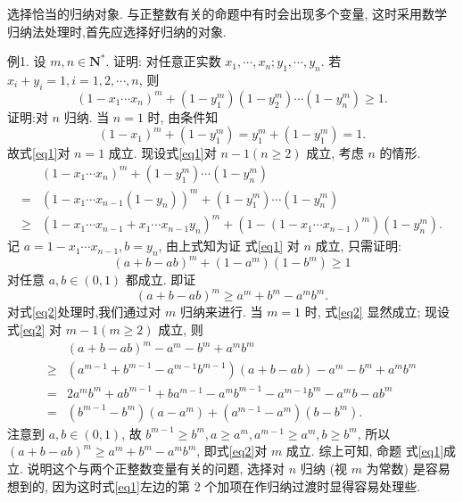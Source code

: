 
选择恰当的归纳对象.
与正整数有关的命题中有时会出现多个变量, 这时采用数学归纳法处理时,首先应选择好归纳的对象.



例1. 设 $m, n \in \mathbf{N}^*$. 证明: 对任意正实数 $x_1, \cdots, x_n ; y_1, \cdots, y_n$. 若 $x_i+ y_i=1, i=1,2, \cdots, n$, 则
$$
\left(1-x_1 \cdots x_n\right)^m+\left(1-y_1^m\right)\left(1-y_2^m\right) \cdots\left(1-y_n^m\right) \geqslant 1 . \label{eq1}
$$
证明:对 $n$ 归纳.
当 $n=1$ 时, 由条件知
$$
\left(1-x_1\right)^m+\left(1-y_1^m\right)=y_1^m+\left(1-y_1^m\right)=1 .
$$
故式\ref{eq1}对 $n=1$ 成立.
现设式\ref{eq1}对 $n-1(n \geqslant 2)$ 成立, 考虑 $n$ 的情形.
$$
\begin{aligned}
& \left(1-x_1 \cdots x_n\right)^m+\left(1-y_1^m\right) \cdots\left(1-y_n^m\right) \\
= & \left(1-x_1 \cdots x_{n-1}\left(1-y_n\right)\right)^m+\left(1-y_1^m\right) \cdots\left(1-y_n^m\right) \\
\geqslant & \left(1-x_1 \cdots x_{n-1}+x_1 \cdots x_{n-1} y_n\right)^m+\left(1-\left(1-x_1 \cdots x_{n-1}\right)^m\right)\left(1-y_n^m\right) .
\end{aligned}
$$
记 $a=1-x_1 \cdots x_{n-1}, b=y_n$, 由上式知为证 式\ref{eq1} 对 $n$ 成立, 只需证明:
$$
(a+b-a b)^m+\left(1-a^m\right)\left(1-b^m\right) \geqslant 1
$$
对任意 $a, b \in(0,1)$ 都成立.
即证
$$
(a+b-a b)^m \geqslant a^m+b^m-a^m b^m . \label{eq2}
$$
对式\ref{eq2}处理时,我们通过对 $m$ 归纳来进行.
当 $m=1$ 时, 式\ref{eq2} 显然成立; 现设 式\ref{eq2} 对 $m-1(m \geqslant 2)$ 成立, 则
$$
\begin{aligned}
& (a+b-a b)^m-a^m-b^m+a^m b^m \\
\geqslant & \left(a^{m-1}+b^{m-1}-a^{m-1} b^{m-1}\right)(a+b-a b)-a^m-b^m+a^m b^m \\
= & 2 a^m b^m+a b^{m-1}+b a^{m-1}-a^m b^{m-1}-a^{m-1} b^m-a^m b-a b^m \\
= & \left(b^{m-1}-b^m\right)\left(a-a^m\right)+\left(a^{m-1}-a^m\right)\left(b-b^m\right) .
\end{aligned}
$$
注意到 $a, b \in(0,1)$, 故 $b^{m-1} \geqslant b^m, a \geqslant a^m, a^{m-1} \geqslant a^m, b \geqslant b^m$, 所以 $(a+b- a b)^m \geqslant a^m+b^m-a^m b^m$, 即式\ref{eq2}对 $m$ 成立.
综上可知, 命题 式\ref{eq1}成立.
说明这个与两个正整数变量有关的问题, 选择对 $n$ 归纳 (视 $m$ 为常数) 是容易想到的, 因为这时式\ref{eq1}左边的第 2 个加项在作归纳过渡时显得容易处理些.



